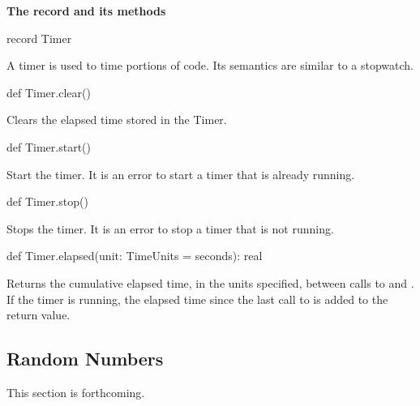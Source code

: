 {\bf The  record and its methods}

\begin{chapel}
record Timer
\end{chapel}
A timer is used to time portions of code.  Its semantics are similar
to a stopwatch.

\begin{chapel}
def Timer.clear()
\end{chapel}
Clears the elapsed time stored in the Timer.

\begin{chapel}
def Timer.start()
\end{chapel}
Start the timer.  It is an error to start a timer that is already
running.

\begin{chapel}
def Timer.stop()
\end{chapel}
Stops the timer.  It is an error to stop a timer that is not running.

\begin{chapel}
def Timer.elapsed(unit: TimeUnits = seconds): real
\end{chapel}
Returns the cumulative elapsed time, in the units specified, between
calls to  and .  If the timer is running, the
elapsed time since the last call to  is added to the
return value.

\subsection{Random Numbers}
\label{Random_Numbers}

This section is forthcoming.
